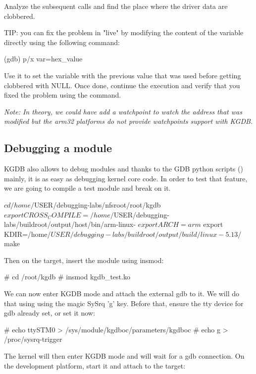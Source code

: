 Analyze the subsequent calls and find the place where the driver data are
clobbered.

TIP: you can fix the problem in "live" by modifying the content of the
 variable directly using the following command:

\begin{bashinput}
(gdb) p/x var=hex_value
\end{bashinput}

Use it to set the variable with the previous value that was used before getting
clobbered with NULL. Once done, continue the execution and verify that you fixed
the problem using the  command.

{\em Note: In theory, we could have add a watchpoint to watch the address that
was modified but the arm32 platforms do not provide watchpoints support with
KGDB.}

\subsection{Debugging a module}

KGDB also allows to debug modules and thanks to the GDB python scripts
() mainly, it is as easy as debugging kernel core code. In
order to test that feature, we are going to compile a test module and break on
it.

\begin{bashinput}
$ cd /home/$USER/debugging-labs/nfsroot/root/kgdb
$ export CROSS_COMPILE=/home/$USER/debugging-labs/buildroot/output/host/bin/arm-linux-
$ export ARCH=arm
$ export KDIR=/home/$USER/debugging-labs/buildroot/output/build/linux-5.13/
$ make
\end{bashinput}

Then on the target, insert the module using insmod:
\begin{bashinput}
# cd /root/kgdb
# insmod kgdb_test.ko
\end{bashinput}

We can now enter KGDB mode and attach the external gdb to it. We will do
that using using the magic SySrq 'g' key. Before that, ensure the tty
device for gdb already set, or set it now:

\begin{bashinput}
# echo ttySTM0 > /sys/module/kgdboc/parameters/kgdboc
# echo g > /proc/sysrq-trigger
\end{bashinput}

The kernel will then enter KGDB mode and will wait for a gdb connection. On the
development platform, start it and attach to the target:

